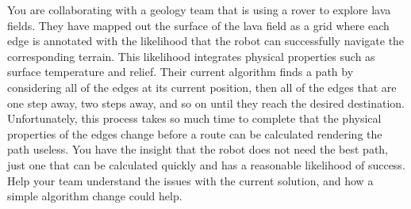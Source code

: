\documentclass[12pt]{article}
\begin{document}
\renewcommand{\headrulewidth}{0.5pt}

\phantom{Test}
You are collaborating with a geology team that is using a rover to explore lava
fields.  They have mapped out the surface of the lava field as a grid where
each edge is annotated with the likelihood that the robot can successfully
navigate the corresponding terrain. This likelihood integrates physical
properties such as surface temperature and relief. Their current algorithm
finds a path by considering all of the edges at its current position, then all
of the edges that are one step away, two steps away, and so on until they reach
the desired destination. Unfortunately, this process takes so much time to
complete that the physical properties of the edges change before a route can be
calculated rendering the path useless. You have the insight that the robot does
not need the best path, just one that can be calculated quickly and has a
reasonable likelihood of success. Help your team understand the issues with the
current solution, and how a simple algorithm change could help.

\pagebreak
\end{document}
